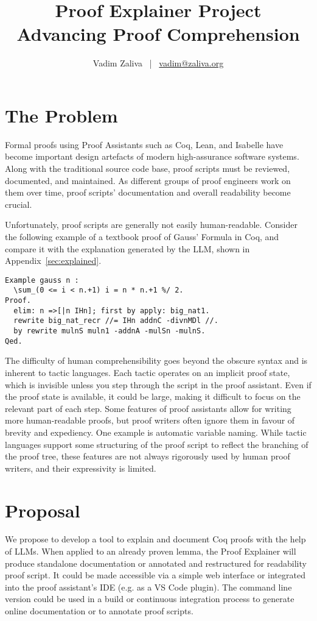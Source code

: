 \documentclass[letterpaper]{article}
\title{Proof Explainer Project \\ \large Advancing Proof Comprehension}
\date{} %
\author{Vadim Zaliva ~|~ \href{mailto:vadim@zaliva.org}{vadim@zaliva.org}}
\begin{document}
\maketitle
\thispagestyle{fancy}
\section*{The Problem}

Formal proofs using Proof Assistants such as Coq, Lean, and Isabelle
have become important design artefacts of modern high-assurance
software systems. Along with the traditional source code base, proof
scripts must be reviewed, documented, and maintained. As different
groups of proof engineers work on them over time, proof scripts'
documentation and overall readability become crucial.

Unfortunately, proof scripts are generally not easily
human-readable. Consider the following example of a textbook
\cite{mahboubi2021mathematical} proof of Gauss' Formula in Coq, and
compare it with the explanation generated by the LLM, shown in
Appendix~\ref{sec:explained}.

\begin{lstlisting}
Example gauss n :
  \sum_(0 <= i < n.+1) i = n * n.+1 %/ 2.
Proof.
  elim: n =>[|n IHn]; first by apply: big_nat1.
  rewrite big_nat_recr //= IHn addnC -divnMDl //.
  by rewrite mulnS muln1 -addnA -mulSn -mulnS.
Qed.
\end{lstlisting}

The difficulty of human comprehensibility goes beyond the obscure
syntax and is inherent to tactic languages. Each tactic operates on an
implicit proof state, which is invisible unless you step through the
script in the proof assistant. Even if the proof state is available,
it could be large, making it difficult to focus on the relevant part
of each step. Some features of proof assistants allow for writing more
human-readable proofs, but proof writers often ignore them in favour
of brevity and expediency. One example is automatic variable
naming. While tactic languages support some structuring of the proof
script to reflect the branching of the proof tree, these features are
not always rigorously used by human proof writers, and their
expressivity is limited.

\section*{Proposal}

We propose to develop a tool to explain and document Coq proofs with
the help of LLMs. When applied to an already proven lemma, the Proof
Explainer will produce standalone documentation or annotated and
restructured for readability proof script. It could be made accessible
via a simple web interface or integrated into the proof assistant’s
IDE (e.g. as a VS Code plugin). The command line version could be used
in a build or continuous integration process to generate online
documentation or to annotate proof scripts.
\end{document}
